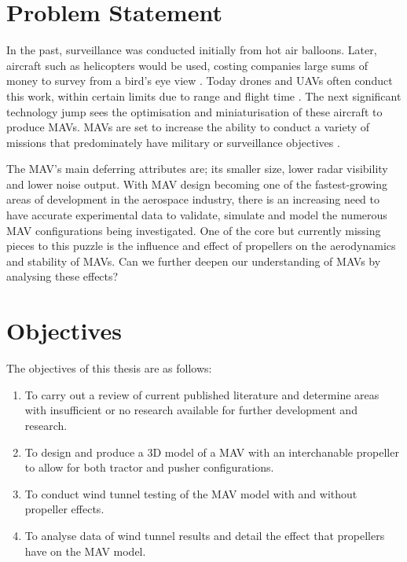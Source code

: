 % 





\section{Problem Statement}
\label{ProblemStatement}

In the past, surveillance was conducted initially from hot air balloons. Later, aircraft such as helicopters would be used, costing companies large sums of money to survey from a bird's eye view \cite{Aleksander2018}. Today drones and UAVs often conduct this work, within certain limits due to range and flight time \cite{NONAMI2007} \cite{Aleksander2018}. The next significant technology jump sees the optimisation and miniaturisation of these aircraft to produce MAVs. MAVs are set to increase the ability to conduct a variety of missions that predominately have military or surveillance objectives \cite{Aleksander2018} \cite{Mil2022} \cite{Greenwood2019} \cite{Saytov2022}. 

The MAV's main deferring attributes are; its smaller size, lower radar visibility and lower noise output. With MAV design becoming one of the fastest-growing areas of development in the aerospace industry, there is an increasing need to have accurate experimental data to validate, simulate and model the numerous MAV configurations being investigated. One of the core but currently missing pieces to this puzzle is the influence and effect of propellers on the aerodynamics and stability of MAVs. Can we further deepen our understanding of MAVs by analysing these effects?




\section{Objectives}
\label{sec:Objectives}
The objectives of this thesis are as follows:

\begin{enumerate}
  \item To carry out a review of current published literature and determine areas with insufficient or no research available for further development and research.
  \item To design and produce a 3D model of a MAV with an interchanable propeller to allow for both tractor and pusher configurations.
  \item To conduct wind tunnel testing of the MAV model with and without propeller effects.
  \item To analyse data of wind tunnel results and detail the effect that propellers have on the MAV model.
\end{enumerate}

